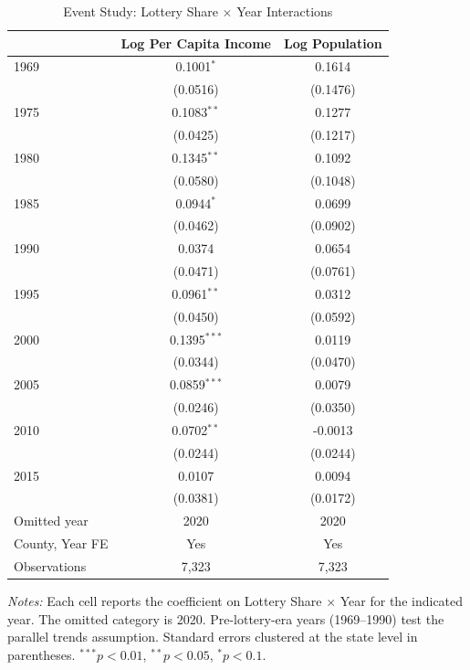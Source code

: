 \begin{table}[htbp]
\centering
\caption{Event Study: Lottery Share $\times$ Year Interactions}
\label{tab:eventstudy}
\begin{tabular}{lcc}
\hline\hline
 & Log Per Capita Income & Log Population \\
\hline
1969 & 0.1001$^{*}$ & 0.1614 \\
 & (0.0516) & (0.1476) \\
1975 & 0.1083$^{**}$ & 0.1277 \\
 & (0.0425) & (0.1217) \\
1980 & 0.1345$^{**}$ & 0.1092 \\
 & (0.0580) & (0.1048) \\
1985 & 0.0944$^{*}$ & 0.0699 \\
 & (0.0462) & (0.0902) \\
1990 & 0.0374 & 0.0654 \\
 & (0.0471) & (0.0761) \\
1995 & 0.0961$^{**}$ & 0.0312 \\
 & (0.0450) & (0.0592) \\
2000 & 0.1395$^{***}$ & 0.0119 \\
 & (0.0344) & (0.0470) \\
2005 & 0.0859$^{***}$ & 0.0079 \\
 & (0.0246) & (0.0350) \\
2010 & 0.0702$^{**}$ & -0.0013 \\
 & (0.0244) & (0.0244) \\
2015 & 0.0107 & 0.0094 \\
 & (0.0381) & (0.0172) \\
\addlinespace
Omitted year & 2020 & 2020 \\
County, Year FE & Yes & Yes \\
Observations & 7,323 & 7,323 \\
\hline\hline
\end{tabular}
\vspace{0.5em}\begin{flushleft}\small
\textit{Notes:} Each cell reports the coefficient on Lottery Share $\times$ Year for the indicated year. The omitted category is 2020. Pre-lottery-era years (1969--1990) test the parallel trends assumption. Standard errors clustered at the state level in parentheses. $^{***}p<0.01$, $^{**}p<0.05$, $^{*}p<0.1$.
\end{flushleft}
\end{table}


